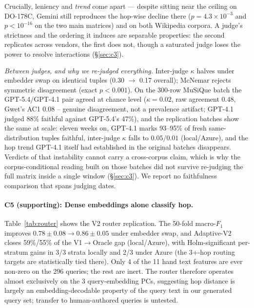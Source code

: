 Crucially, leniency and \emph{trend} come apart --- despite sitting near
the ceiling on DO-178C, Gemini still reproduces the hop-wise decline
there ($p{=}4.3{\times}10^{-3}$ and $p{<}10^{-16}$ on the two main
matrices) and on both Wikipedia corpora. A judge's strictness and the
ordering it induces are separable properties: the second replicates
across vendors, the first does not, though a saturated judge loses the
power to resolve interactions (\S\ref{sec:c3}).

\noindent\textit{Between judges, and why we re-judged everything.}
Inter-judge $\kappa$ halves under embedder swap on identical tuples
(0.30 $\to$ 0.17 overall); McNemar rejects symmetric disagreement
(exact $p{<}0.001$). On the 300-row MuSiQue batch the GPT-5.4/GPT-4.1
pair agreed at chance level ($\kappa{=}0.02$, raw agreement 0.48, Gwet's
AC1 0.08 -- genuine disagreement, not a prevalence artifact; GPT-4.1
judged 88\% faithful against GPT-5.4's 47\%), and the replication
batches show the same at scale: eleven weeks on, GPT-4.1 marks
93--95\% of fresh same-distribution tuples faithful, inter-judge
$\kappa$ falls to $0.05/0.01$ (local/Azure), and the hop trend GPT-4.1
itself had established in the original batches disappears. Verdicts of
that instability cannot carry a cross-corpus claim, which is why the
corpus-conditional reading built on those batches did not survive
re-judging the full matrix inside a single window (\S\ref{sec:c3}). We
report no faithfulness comparison that spans judging dates.



\paragraph{C5 (supporting): Dense embeddings alone classify hop.}
Table~\ref{tab:router} shows the V2 router replication. The 50-fold
macro-$F_1$ improves $0.78\pm0.08\to 0.86\pm0.05$ under embedder swap,
and Adaptive-V2 closes 59\%/55\% of the V1$\to$Oracle gap
(local/Azure), with Holm-significant per-stratum gains in 3/3 strata
locally and 2/3 under Azure (the 3+-hop routing targets are
statistically tied there). Only 4 of the 11 hand text
features are ever non-zero on the 296 queries; the rest are inert. The router therefore operates almost
exclusively on the 3 query-embedding PCs, suggesting hop distance is
largely an embedding-decodable property of the query text in our
generated query set; transfer to human-authored queries is untested.
